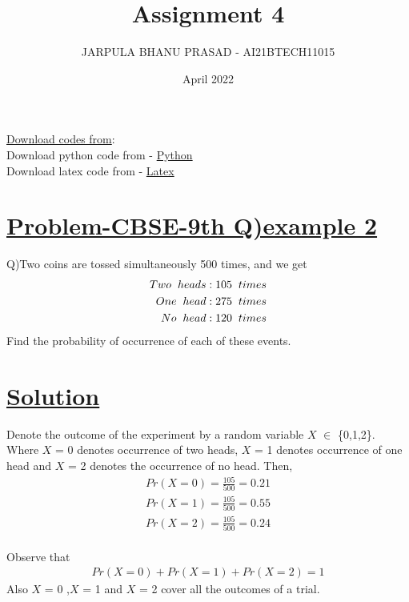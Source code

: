 \documentclass[journal,12pt,twocolumn]{IEEEtran}
\title{Assignment 4}
\author{JARPULA BHANU PRASAD - AI21BTECH11015}
\date{April 2022}
\begin{document}
\maketitle
\noindent \Large\underline{Download codes from}:\\
\noindent \large Download python code from - \href{https://github.com/jarpula-Bhanu/Assignment-4/blob/main/codes/probability.py}{Python}\\ Download latex code from - \href{https://github.com/jarpula-Bhanu/Assignment-4/blob/main/Assignment4.tex}{Latex}
\section{\large\underline{Problem-CBSE-9th Q)example 2}}
\large \noindent Q)Two coins are tossed simultaneously 500 times, and we get
\begin{align*}
Two \hspace{2mm} heads : 105 \hspace{2mm} times \\
One \hspace{2mm} head : 275 \hspace{2mm} times \\
No \hspace{2mm} head : 120 \hspace{2mm} times
\end{align*}
Find the probability of occurrence of each of these events.

\section{\large\underline{Solution}}
\noindent Denote the outcome of the experiment by a random variable $X$ $\in$ \{0,1,2\}.\\ Where $X$ = 0 denotes occurrence of two heads, $X$ = 1 denotes occurrence of one head and $X$ = 2 denotes the occurrence of no head. Then,
\begin{align}
Pr(X = 0) = \frac{105}{500} = 0.21 \\
Pr(X = 1) = \frac{105}{500} = 0.55 \\
Pr(X = 2) = \frac{105}{500} = 0.24 
\end{align}\\
Observe that 
\begin{align*}
Pr(X = 0) + Pr(X = 1) + Pr(X = 2) = 1
\end{align*}
 Also $X$ = 0 ,$X$ = 1 and $X$ = 2 cover all the outcomes of a trial.
\end{document}
